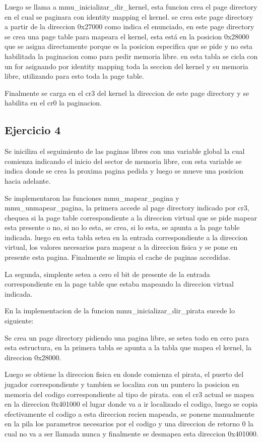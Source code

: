 Luego se llama a mmu_inicializar_dir_kernel, esta funcion crea el page directory en el cual se paginara
con identity mapping el kernel. se crea este page directory a partir de la direccion 0x27000 como indica el enunciado,
en este page directory se crea una page table para mapeara el kernel, esta está en la posicion 0x28000 que
se asigna directamente porque es la posicion especifica que se pide y no esta habilitada la paginacion como
para pedir memoria libre. en esta tabla se cicla con un for asignando por identity mapping toda la
seccion del kernel y su memoria libre, utilizando para esto toda la page table.

Finalmente se carga en el cr3 del kernel la direccion de este page directory y se habilita en el cr0 la paginacion.


\subsection{Ejercicio 4}

Se iniciliza el seguimiento de las paginas libres con una variable global la cual comienza indicando el inicio
del sector de memoria libre, con esta variable se indica donde se crea la proxima pagina pedida y luego se mueve
una posicion hacia adelante.

Se implementaron las funciones mmu_mapear_pagina y mmu_unmapear_pagina, la primera accede al page directory
indicado por cr3, chequea si la page table correspondiente a la direccion virtual que se pide mapear esta presente o no,
si no lo esta, se crea, si lo esta, se apunta a la page table indicada. luego en esta tabla setea en la entrada correspondiente
a la direccion virtual, los valores necesarios para mapear a la direccion fisica y se pone en presente esta pagina.
Finalmente se limpia el cache de paginas accedidas.

La segunda, simplente setea a cero el bit de presente de la entrada correspondiente en la page table que estaba mapeando la direccion
virtual indicada.

En la implementacion de la funcion mmu_inicializar_dir_pirata sucede lo siguiente:

Se crea un page directory pidiendo una pagina libre, se setea todo en cero para esta estructura,
en la primera tabla se apunta a la tabla que mapea el kernel, la direccion 0x28000.

Luego se obtiene la direccion fisica en donde comienza el pirata, el puerto del jugador correspondiente y
tambien se localiza con un puntero la posicion en memoria del codigo correspondiente al tipo de pirata.
con el cr3 actual se mapea en la direccion 0x401000 el lugar donde va a ir localizado el codigo,
luego se copia efectivamente el codigo a esta direccion recien mapeada, se ponene manualmente en la pila
los parametros necesarios por el codigo y una direccion de retorno 0 la cual no va a ser llamada nunca y
finalmente se desmapea esta direccion 0x401000.

